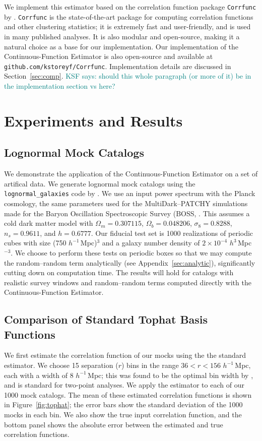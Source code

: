 \documentclass[modern]{aastex62}
\newcommand{\est}{the Continuous-Function Estimator\xspace}
\newcommand{\hmpc}{$h^{-1}\,$Mpc}
\newcommand{\KSF}[1]{\textcolor{teal}{KSF says: #1}}
\begin{document}
We implement this estimator based on the correlation function package \texttt{Corrfunc} by \cite{Sinha2019}.
\texttt{Corrfunc} is the state-of-the-art package for computing correlation functions and other clustering statistics; it is extremely fast and user-friendly, and is used in many published analyses.
It is also modular and open-source, making it a natural choice as a base for our implementation.
Our implementation of \est is also open-source and available at \texttt{github.com/kstoreyf/Corrfunc}.
Implementation details are discussed in Section~\ref{sec:comp}. \KSF{should this whole paragraph (or more of it) be in the implementation section vs here?}


\section{Experiments and Results}
\label{sec:experiments}

\subsection{Lognormal Mock Catalogs}

We demonstrate the application of \est on a set of artifical data.
We generate lognormal mock catalogs \citep{ColesJones1991} using the \texttt{lognormal\_galaxies} code by \citep{Agrawal2017}.
We use an input power spectrum with the Planck cosmology, the same parameters used for the MultiDark--PATCHY simulations \citep{Kitaura2016} made for the Baryon Oscillation Spectroscopic Survey (BOSS, \citealt{Dawson2013}.
This assumes a cold dark matter model with $\Omega_m = 0.307115$, $\Omega_b = 0.048206$, $\sigma_8 = 0.8288$, $n_s = 0.9611$, and $h = 0.6777$.
Our fiducial test set is 1000 realizations of periodic cubes with size (750 \hmpc)$^3$ and a galaxy number density of $2 \times 10^{-4}$ $h^{3}\,$Mpc$^{-3}$.
We choose to perform these tests on periodic boxes so that we may compute the random--random term analytically (see Appendix~\ref{sec:analytic}), significantly cutting down on computation time.
The results will hold for catalogs with realistic survey windows and random--random terms computed directly with \est.

\subsection{Comparison of Standard Tophat Basis Functions}

We first estimate the correlation function of our mocks using the the standard estimator.
We choose 15 separation ($r$) bins in the range $36 < r < 156$ \hmpc, each with a width of 8 \hmpc; this was found to be the optimal bin width by \cite{Percival2014}, and is standard for two-point analyses.
We apply the estimator to each of our 1000 mock catalogs.
The mean of these estimated correlation functions is shown in Figure~\ref{fig:tophat}; the error bars show the standard deviation of the 1000 mocks in each bin.
We also show the true input correlation function, and the bottom panel shows the absolute error between the estimated and true correlation functions.
\end{document}
